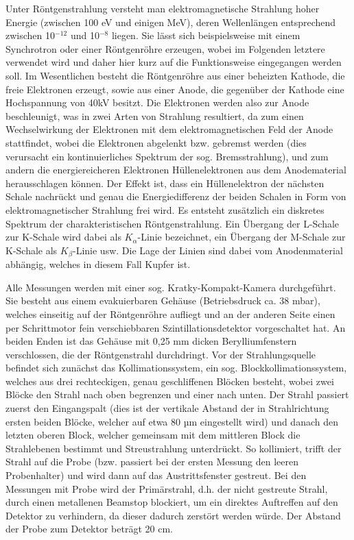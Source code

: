 \documentclass[bigchapter,colorback,accentcolor=tud4b,linedtoc,11pt]{tudreport}
\begin{document}
Unter Röntgenstrahlung versteht man elektromagnetische Strahlung hoher Energie (zwischen 100 eV und einigen MeV), deren Wellenlängen entsprechend zwischen 10$^{-12}$ und 10$^{-8}$ liegen. Sie lässt sich beispielsweise mit einem Synchrotron oder einer Röntgenröhre erzeugen, wobei im Folgenden letztere verwendet wird und daher hier kurz auf die Funktionsweise eingegangen werden soll. Im Wesentlichen besteht die Röntgenröhre aus einer beheizten Kathode, die freie Elektronen erzeugt, sowie aus einer Anode, die gegenüber der Kathode eine Hochspannung von 40kV besitzt. Die Elektronen werden also zur Anode beschleunigt, was in zwei Arten von Strahlung resultiert, da zum einen Wechselwirkung der Elektronen mit dem elektromagnetischen Feld der Anode stattfindet, wobei die Elektronen abgelenkt bzw. gebremst werden (dies verursacht ein kontinuierliches Spektrum der sog. Bremsstrahlung), und zum andern die energiereicheren Elektronen Hüllenelektronen aus dem Anodematerial herausschlagen können. Der Effekt ist, dass ein Hüllenelektron der nächsten Schale nachrückt und genau die Energiedifferenz der beiden Schalen in Form von elektromagnetischer Strahlung frei wird. Es entsteht zusätzlich ein diskretes Spektrum der charakteristischen Röntgenstrahlung. Ein Übergang der L-Schale zur K-Schale wird dabei als $K_{\alpha}$-Linie bezeichnet, ein Übergang der M-Schale zur K-Schale als $K_{\beta}$-Linie usw. Die Lage der Linien sind dabei vom Anodenmaterial abhängig, welches in diesem Fall Kupfer ist. 

Alle Messungen werden mit einer sog. Kratky-Kompakt-Kamera durchgeführt. Sie besteht aus einem evakuierbaren Gehäuse (Betriebsdruck ca. 38 mbar), welches einseitig auf der Röntgenröhre aufliegt und an der anderen Seite einen per Schrittmotor fein verschiebbaren Szintillationsdetektor vorgeschaltet hat. An beiden Enden ist das Gehäuse mit 0,25 mm dicken Berylliumfenstern verschlossen, die der Röntgenstrahl durchdringt. Vor der Strahlungsquelle befindet sich zunächst das Kollimationssystem, ein sog. Blockkollimationssystem, welches aus drei rechteckigen, genau geschliffenen Blöcken besteht, wobei zwei Blöcke den Strahl nach oben begrenzen und einer nach unten. Der Strahl passiert zuerst den Eingangspalt (dies ist der vertikale Abstand der in Strahlrichtung ersten beiden Blöcke, welcher auf etwa 80 µm eingestellt wird) und danach den letzten oberen Block, welcher gemeinsam mit dem mittleren Block die Strahlebenen bestimmt und Streustrahlung unterdrückt. So kollimiert, trifft der Strahl auf die Probe (bzw. passiert bei der ersten Messung den leeren Probenhalter) und wird dann auf das Austrittsfenster gestreut. Bei den Messungen mit Probe wird der Primärstrahl, d.h. der nicht gestreute Strahl, durch einen metallenen Beamstop blockiert, um ein direktes Auftreffen auf den Detektor zu verhindern, da dieser dadurch zerstört werden würde. Der Abstand der Probe zum Detektor beträgt 20 cm.
\end{document}
